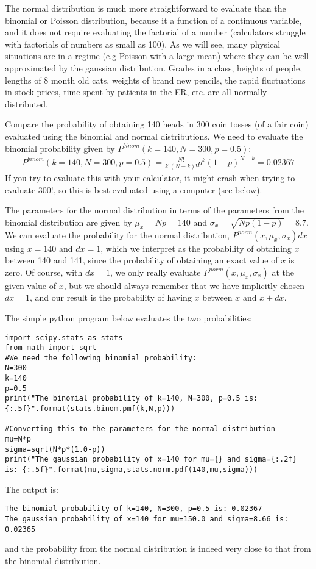 The normal distribution is much more straightforward to evaluate than the binomial or Poisson distribution, because it a function of a continuous variable, and it does not require evaluating the factorial of a number (calculators struggle with factorials of numbers as small as 100). As we will see, many physical situations are in a regime (e.g Poisson with a large mean) where they can be well approximated by the gaussian distribution. Grades in a class, heights of people, lengths of 8 month old cats, weights of brand new pencils, the rapid fluctuations in stock prices, time spent by patients in the ER, etc. are all normally distributed. 
\clearpage
\begin{example}{}{Compare the probability of obtaining 140 heads in 300 coin tosses (of a fair coin) evaluated using the binomial and normal distributions.}{}
We need to evaluate the binomial probability given by $P^{binom}(k=140,N=300,p=0.5)$:
\begin{align*}
P^{binom}(k=140,N=300,p=0.5)=\frac{N!}{k!(N-k)!}p^k(1-p)^{N-k}=0.02367
\end{align*}
If you try to evaluate this with your calculator, it might crash when trying to evaluate $300!$, so this is best evaluated using a computer (see below).

The parameters for the normal distribution in terms of the parameters from the binomial distribution are given by $\mu_x=Np=140$ and $\sigma_x=\sqrt{Np(1-p)}=8.7$. We can evaluate the probability for the normal distribution, $P^{norm}(x,\mu_x,\sigma_x)dx$ using $x=140$ and $dx=1$, which we interpret as the probability of obtaining $x$ between 140 and 141, since the probability of obtaining an exact value of $x$ is zero. Of course, with $dx=1$, we only really evaluate $P^{norm}(x,\mu_x,\sigma_x)$ at the given value of $x$, but we should always remember that we have implicitly chosen $dx=1$, and our result is the probability of having $x$ between $x$ and $x+dx$. 

The simple python program below evaluates the two probabilities:  
\begin{lstlisting}
import scipy.stats as stats
from math import sqrt
#We need the following binomial probability:
N=300
k=140
p=0.5
print("The binomial probability of k=140, N=300, p=0.5 is: {:.5f}".format(stats.binom.pmf(k,N,p)))

#Converting this to the parameters for the normal distribution
mu=N*p
sigma=sqrt(N*p*(1.0-p))
print("The gaussian probability of x=140 for mu={} and sigma={:.2f} is: {:.5f}".format(mu,sigma,stats.norm.pdf(140,mu,sigma)))
\end{lstlisting}
The output is:
\begin{verbatim}
The binomial probability of k=140, N=300, p=0.5 is: 0.02367
The gaussian probability of x=140 for mu=150.0 and sigma=8.66 is: 0.02365
\end{verbatim}
and the probability from the normal distribution is indeed very close to that from the binomial distribution.
\end{example}

